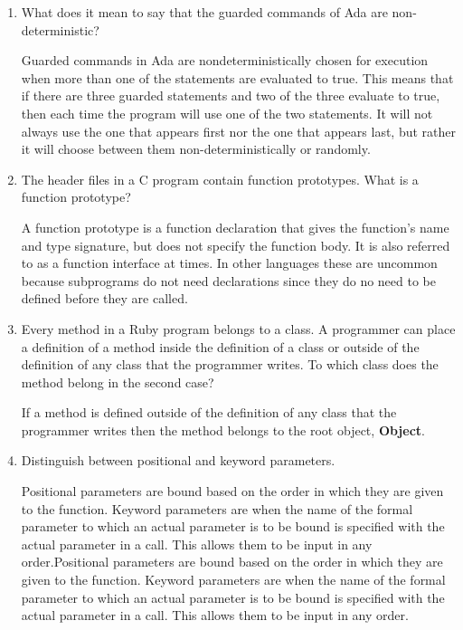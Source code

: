 \begin{enumerate}
  \item What does it mean to say that the guarded commands
    of Ada are non-deterministic?

 \begin{answer}

Guarded commands in Ada are nondeterministically chosen for execution when more than
 one of the statements are evaluated to true. This means that if there are three
 guarded statements and two of the three evaluate to true, then each time the
 program will use one of the two statements. It will not always use the one that
 appears first nor the one that appears last, but rather it will choose between them
 non-deterministically or randomly.
    \end{answer}

  \item The header files in a C program contain function
    prototypes. What is a function prototype?

\begin{answer}

A function prototype is a function declaration that gives the function's name and
 type signature, but does not specify the function body. It is also referred to as
 a function interface at times. In other languages these are uncommon because
 subprograms do not need declarations since they do no need to be defined before
 they are called. 
    \end{answer}

  \item Every method in a Ruby program belongs to a class.
    A programmer can place a definition of a method inside
    the definition of a class or outside of the definition
    of any class that the programmer writes. To which class
    does the method belong in the second case?

\begin{answer}

If a method is defined outside of the definition of any class that the programmer
 writes then the method belongs to the root object, \textbf{Object}.
    \end{answer}

  \item Distinguish between positional and keyword parameters.

\begin{answer}
Positional parameters are bound based on the order in which they are given to the
 function. Keyword parameters are when the name of the formal parameter to which an
 actual parameter is to be bound is specified with the actual parameter in a call.
 This allows them to be input in any order.Positional parameters are bound based on
 the order in which they are given to the function. Keyword parameters are when the
 name of the formal parameter to which an actual parameter is to be bound is
 specified with the actual parameter in a call. This allows them to be input in any
 order.


\end{answer}
\end{enumerate}
